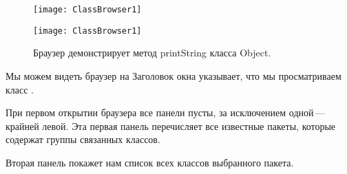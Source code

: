 \documentclass[a4paper,10pt,twoside]{book}
\begin{document}


\begin{figure}[htb]
\ifluluelse
	{\centerline {\texttt{[image: ClassBrowser1]}}}
	{\centerline {\texttt{[image: ClassBrowser1]}}}
\caption{Браузер демонстрирует метод printString класса Object.
}
\end{figure}


Мы можем видеть браузер на  Заголовок окна
указывает, что мы просматриваем класс . 


При первом открытии браузера все панели пусты, за исключением
одной\,---\,крайней левой. Эта первая панель перечисляет все известные
пакеты, которые содержат группы связанных классов.
 


Вторая панель покажет нам список всех классов выбранного пакета. 

\end{document}
